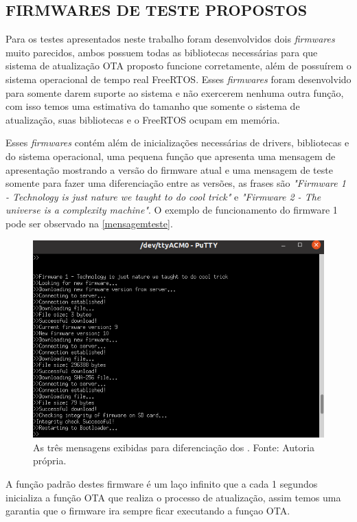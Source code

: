 \subsection {FIRMWARES DE TESTE PROPOSTOS}
Para os testes apresentados neste trabalho foram desenvolvidos dois \textit{firmwares} muito parecidos, ambos possuem todas as bibliotecas necessárias para que sistema de atualização OTA proposto funcione corretamente, além de possuírem o sistema operacional de tempo real FreeRTOS. Esses \textit{firmwares} foram desenvolvido para somente darem suporte ao sistema e não exercerem nenhuma outra função, com isso temos uma estimativa do tamanho que somente o sistema de atualização, suas bibliotecas e o FreeRTOS ocupam em memória.

Esses \textit{firmwares} contém além de inicializações necessárias de drivers, bibliotecas e do sistema operacional, uma pequena função que apresenta uma mensagem de apresentação mostrando a versão do firmware atual e uma mensagem de teste somente para fazer uma diferenciação entre as versões, as frases são \textit{"Firmware 1 - Technology is just nature we taught to do cool trick"} e \textit{"Firmware 2 - The universe is a complexity machine"}. O exemplo de funcionamento do firmware 1 pode ser observado na \autoref{mensagemteste}. 

\begin{figure}[H]
    \scriptsize
     \centering
     \includegraphics[scale=1]{dados/figuras/Firmware1.png}
     \caption{As três mensagens exibidas para diferenciação dos \firmware. \newline Fonte: Autoria própria.}
     \label{mensagemteste}
\end{figure}

A função padrão destes firmware é um laço infinito que a cada 1 segundos inicializa a função OTA que realiza o processo de atualização, assim temos uma garantia que o firmware ira sempre ficar executando a funçao OTA.
